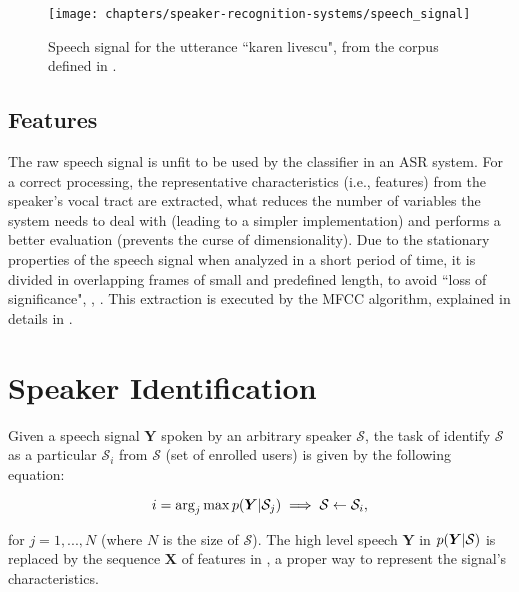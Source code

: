 \begin{figure}[ht]
    \centering
    \texttt{[image: chapters/speaker-recognition-systems/speech\_signal]}
    \caption{Speech signal for the utterance ``karen livescu", from the corpus defined in .}
    \label{fig:speech_signal}
\end{figure}

\subsection{Features}

The raw speech signal is unfit to be used by the classifier in an ASR system. For a correct processing, the representative characteristics (i.e., features) from the speaker's vocal tract are extracted, what reduces the number of variables the system needs to deal with (leading to a simpler implementation) and performs a better evaluation (prevents the curse of dimensionality). Due to the stationary properties of the speech signal when analyzed in a short period of time, it is divided in overlapping frames of small and predefined length, to avoid ``loss of significance", , . This extraction is executed by the MFCC algorithm, explained in details in .

\section{Speaker Identification}
\label{sec:speaker-identification}

Given a speech signal $\boldsymbol{Y}$ spoken by an arbitrary speaker $\mathcal{S}$, the task of identify $\mathcal{S}$ as a particular $\mathcal{S}_i$ from $\boldsymbol{\mathcal{S}}$ (set of enrolled users) is given by the following equation:

\begin{equation}
    i = \arg_j\max\postpdf{\boldsymbol{Y}}{\mathcal{S}_j} \implies \mathcal{S} \gets \mathcal{S}_i,
    \label{eq:classification_speaker_identification}
\end{equation}

\noindent for $j = 1, ..., N$ (where $N$ is the size of $\boldsymbol{\mathcal{S}}$). The high level speech $\boldsymbol{Y}$ in $p(\boldsymbol{Y}|\mathcal{S})$ is replaced by the sequence $\boldsymbol{X}$ of features in , a proper way to represent the signal's characteristics.

